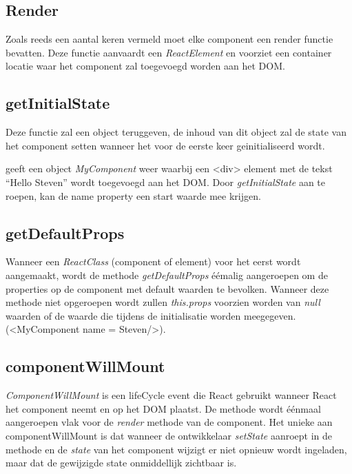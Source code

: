 	\subsection{Render}
		
		Zoals reeds een aantal keren vermeld moet elke component een render functie bevatten. Deze functie aanvaardt een \emph{ReactElement} en voorziet een container locatie waar het component zal toegevoegd worden aan het DOM.
	
	\subsection{getInitialState}
		
		Deze functie zal een object teruggeven, de inhoud van dit object zal de state van het component setten wanneer het voor de eerste keer geinitialiseerd wordt.
		
		
		 geeft een object \emph{MyComponent} weer waarbij een <div> element met de tekst ``Hello Steven'' wordt toegevoegd aan het DOM. Door \emph{getInitialState} aan te roepen, kan de name property een start waarde mee krijgen.
	
	\subsection{getDefaultProps}
		
		Wanneer een \emph{ReactClass} (component of element) voor het eerst wordt aangemaakt, wordt de methode \emph{getDefaultProps} éémalig aangeroepen om de properties op de component met default waarden te bevolken. Wanneer deze methode niet opgeroepen wordt zullen \emph{this.props} voorzien worden van \emph{null} waarden of de waarde die tijdens de initialisatie worden meegegeven. (<MyComponent name = \textquotedbl Steven\textquotedbl />).
	
	\subsection{componentWillMount}
		
		\emph{ComponentWillMount} is een lifeCycle event die React gebruikt wanneer React het component neemt en op het DOM plaatst. De methode wordt éénmaal aangeroepen vlak voor de \emph{render} methode van de component. Het unieke aan componentWillMount is dat wanneer de ontwikkelaar \emph{setState} aanroept in de methode en de \emph{state} van het component wijzigt er niet opnieuw wordt ingeladen, maar dat de gewijzigde state onmiddellijk zichtbaar is.
	
